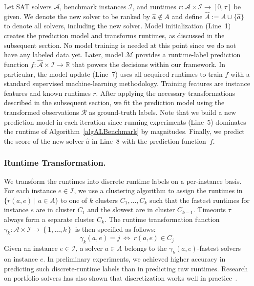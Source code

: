 \documentclass[runningheads]{llncs}
\begin{document}
Let SAT solvers $\mathcal{A}$, benchmark instances $\mathcal{I}$, and runtimes $r : \mathcal{A} \times \mathcal{I} \rightarrow \left[0, \tau\right]$ be given.
We denote the new solver to be ranked by $\hat a \not\in A$ and define $\hat A := A \cup \lbrace \hat a \rbrace$ to denote all solvers, including the new solver. 
Model initialization (Line~1) creates the prediction model and transforms runtimes, as discussed in the subsequent section.
No model training is needed at this point since we do not have any labeled data yet.
Later, model $\mathcal{M}$ provides a runtime-label prediction function $f : \mathcal{\hat A} \times \mathcal{I} \rightarrow \mathbb{R}$ that powers the decisions within our framework.
In particular, the model update (Line~7) uses all acquired runtimes to train $f$ with a standard supervised machine-learning methodology.
Training features are instance features and known runtimes $r$.
After applying the necessary transformations described in the subsequent section, we fit the prediction model using the transformed observations $\mathcal{R}$ as ground-truth labels.
Note that we build a new prediction model in each iteration since running experiments (Line~5) dominates the runtime of Algorithm~\ref{algALBenchmark} by magnitudes.
Finally, we predict the score of the new solver $\hat a$ in Line~8 with the prediction function~$f$.

\subsubsection{Runtime Transformation.}

We transform the runtimes into discrete runtime labels on a per-instance basis.
For each instance $e \in \mathcal{I}$, we use a clustering algorithm to assign the runtimes in $\bigl\{ r(a, e) \mid a \in A \bigr\}$ to one of $k$ clusters $C_1, \dots, C_k$ such that the fastest runtimes for instance $e$ are in cluster $C_1$ and the slowest are in cluster $C_{k-1}$.
Timeouts $\tau$ always form a separate cluster $C_{k}$.
The runtime transformation function $\gamma_k : {\mathcal{A} \times \mathcal{I}} \rightarrow \left\lbrace 1, \dots, k \right\rbrace$ is then specified as follows:
%
$$\gamma_k(a, e) = j ~\Leftrightarrow~ r(a, e) \in C_j$$
%
Given an instance $e \in \mathcal{I}$, a solver $a \in A$ belongs to the $\gamma_k(a, e)$-fastest solvers on instance $e$. 
In preliminary experiments, we achieved higher accuracy in predicting such discrete-runtime labels than in predicting raw runtimes.
Research on portfolio solvers has also shown that discretization works well in practice~\cite{CollauttiMMO13,NgokoCT19}.
\end{document}
